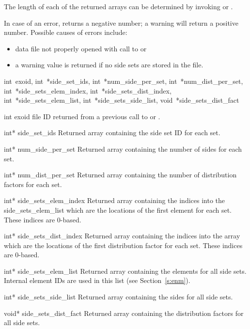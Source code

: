 The length of each of the returned arrays can be determined by
invoking  or .


In case of an error,  returns a
negative number; a warning will return a positive number. Possible
causes of errors include:
\begin{itemize}
 \item data file not properly opened with call to 
 or 

 \item a warning value is returned if no side sets are stored in the
 file.
\end{itemize}

{int~exoid, 
int~*side_set_ids,
int~*num_side_per_set, 
int~*num_dist_per_set, 
int~*side_sets_elem_index,
int~*side_sets_dist_index, 
int~*side_sets_elem_list,
int~*side_sets_side_list, 
void~*side_sets_dist_fact}

\begin{parameters}
\item[{int exoid \R{}}]
\exo{} file ID returned from a previous call to  
or .

\item[{int* side_set_ids \W{}}]
Returned array containing the side set ID for each set.

\item[{int* num_side_per_set \W{}}]
Returned array containing the number of sides for each set.

\item[{int* num_dist_per_set \W{}}]
Returned array containing the number of distribution factors 
for each set.

\item[{int* side_sets_elem_index \W{}}]
Returned array containing the indices into the
{side_sets_elem_list} which are the locations of the first element
for each set. These indices are 0-based.

\item[{int* side_sets_dist_index \W{}}]
Returned array containing the indices into the  
array which are the locations of the first distribution factor 
for each set. These indices are 0-based.

\item[{int* side_sets_elem_list \W{}}]
Returned array containing the elements for all side sets. 
Internal element IDs are used in this list (see  Section~\ref{s:enm}).

\item[{int* side_sets_side_list \W{}}]
Returned array containing the sides for all side sets.

\item[{void* side_sets_dist_fact \W{}}]
Returned array containing the distribution factors for all 
side sets.
\end{parameters}

